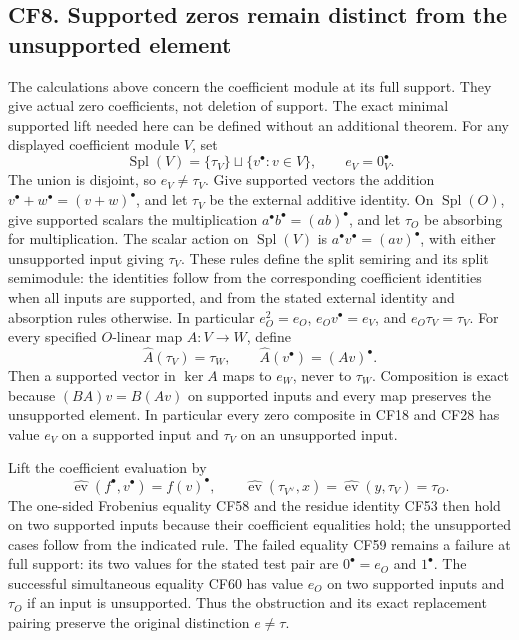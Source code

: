 \documentclass[
  10pt,
]{article}
\begin{document}
\subsection{CF8. Supported zeros remain distinct from the unsupported
element}\label{cf8.-supported-zeros-remain-distinct-from-the-unsupported-element}

The calculations above concern the coefficient module at its full
support. They give actual zero coefficients, not deletion of support.
The exact minimal supported lift needed here can be defined without an
additional theorem. For any displayed coefficient module \(V\), set \[
 \operatorname{Spl}(V)=\{\tau_V\}\sqcup\{v^\bullet:v\in V\},
 \qquad e_V=0_V^\bullet.
 \tag{CF65}
\] The union is disjoint, so \(e_V\neq\tau_V\). Give supported vectors
the addition \(v^\bullet+w^\bullet=(v+w)^\bullet\), and let \(\tau_V\)
be the external additive identity. On \(\operatorname{Spl}(O)\), give
supported scalars the multiplication
\(a^\bullet b^\bullet=(ab)^\bullet\), and let \(\tau_O\) be absorbing
for multiplication. The scalar action on \(\operatorname{Spl}(V)\) is
\(a^\bullet v^\bullet=(av)^\bullet\), with either unsupported input
giving \(\tau_V\). These rules define the split semiring and its split
semimodule: the identities follow from the corresponding coefficient
identities when all inputs are supported, and from the stated external
identity and absorption rules otherwise. In particular \(e_O^2=e_O\),
\(e_Ov^\bullet=e_V\), and \(e_O\tau_V=\tau_V\). For every specified
\(O\)-linear map \(A:V\to W\), define \[
 \widehat A(\tau_V)=\tau_W,
 \qquad \widehat A(v^\bullet)=(Av)^\bullet.
 \tag{CF66}
\] Then a supported vector in \(\ker A\) maps to \(e_W\), never to
\(\tau_W\). Composition is exact because \((BA)v=B(Av)\) on supported
inputs and every map preserves the unsupported element. In particular
every zero composite in CF18 and CF28 has value \(e_V\) on a supported
input and \(\tau_V\) on an unsupported input.

Lift the coefficient evaluation by \[
 \widehat{\operatorname{ev}}(f^\bullet,v^\bullet)
 =f(v)^\bullet,
 \qquad
 \widehat{\operatorname{ev}}(\tau_{V^\vee},x)
 =\widehat{\operatorname{ev}}(y,\tau_V)=\tau_O.
 \tag{CF67}
\] The one-sided Frobenius equality CF58 and the residue identity CF53
then hold on two supported inputs because their coefficient equalities
hold; the unsupported cases follow from the indicated rule. The failed
equality CF59 remains a failure at full support: its two values for the
stated test pair are \(0^\bullet=e_O\) and \(1^\bullet\). The successful
simultaneous equality CF60 has value \(e_O\) on two supported inputs and
\(\tau_O\) if an input is unsupported. Thus the obstruction and its
exact replacement pairing preserve the original distinction
\(e\neq\tau\).
\end{document}
